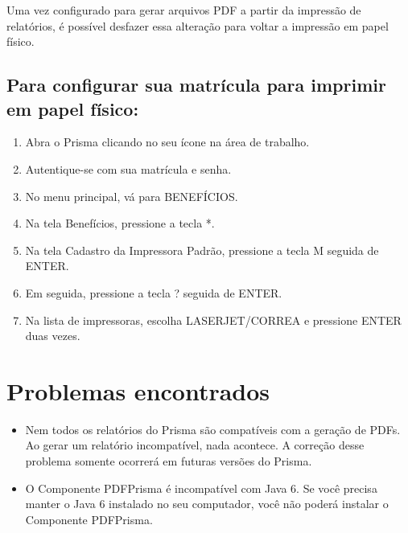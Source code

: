 \documentclass[12pt,a4paper]{article}
\begin{document}
\vspace{0.3cm}
\noindent Uma vez configurado para gerar arquivos PDF a partir da impressão de relatórios, é possível desfazer essa alteração para voltar a impressão em papel físico.

\subsection{Para configurar sua matrícula para imprimir em papel físico:}
\begin{enumerate}
  \item Abra o Prisma clicando no seu ícone na área de trabalho.
  \item Autentique-se com sua matrícula e senha.
  \item No menu principal, vá para BENEFÍCIOS.
  \item Na tela Benefícios, pressione a tecla *.
  \item Na tela Cadastro da Impressora Padrão, pressione a tecla M seguida de ENTER.
  \item Em seguida, pressione a tecla ? seguida de ENTER.
  \item Na lista de impressoras, escolha LASERJET/CORREA e pressione ENTER duas vezes.
\end{enumerate}

\section{Problemas encontrados}
\begin{itemize}
  \item Nem todos os relatórios do Prisma são compatíveis com a geração de PDFs. Ao gerar um relatório incompatível, nada acontece. A correção desse problema somente ocorrerá em futuras versões do Prisma.
\end{itemize}

\begin{itemize}  \item O Componente PDFPrisma é incompatível com Java 6. Se você precisa manter o Java 6 instalado no seu computador, você não poderá instalar o Componente PDFPrisma.
\end{itemize}
\end{document}

